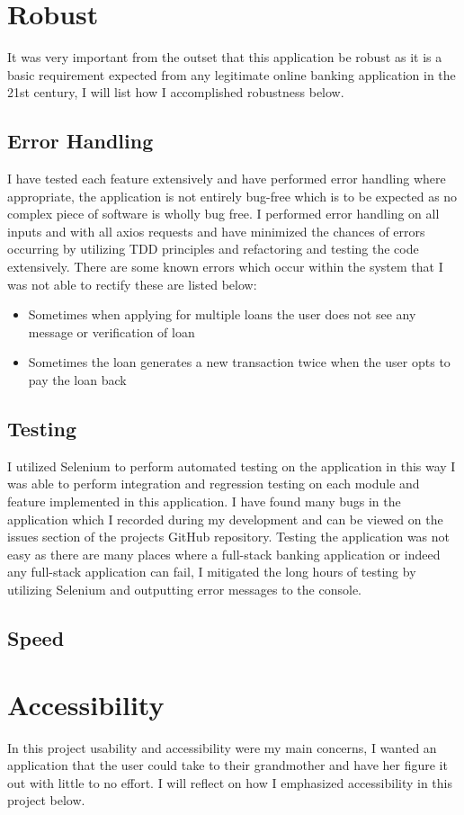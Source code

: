 \section{Robust}
It was very important from the outset that this application be robust as it is a basic requirement expected from any legitimate online banking application in the 21st century, I will list how I accomplished robustness below.
\subsection{Error Handling}
I have tested each feature extensively and have performed error handling where appropriate,
the application is not entirely bug-free which is to be expected as no complex piece of software
is wholly bug free.  I performed error handling on all inputs and with all axios requests and have
minimized the chances of errors occurring by utilizing TDD principles and refactoring and testing
the code extensively.  There are some known errors which occur within the system that I was not able to
rectify these are listed below:
\begin{itemize}
  \item Sometimes when applying for multiple loans the user does not see any message or verification of loan
  \item Sometimes the loan generates a new transaction twice when the user opts to pay the loan back
\end{itemize}
\subsection{Testing}
I utilized Selenium to perform automated testing on the application in this way I was able to perform
integration and regression testing on each module and feature implemented in this application.  I have
found many bugs in the application which I recorded during my development and can be viewed on the issues section
of the projects GitHub repository.  Testing the application was not easy as there are many places where a full-stack
banking application or indeed any full-stack application can fail, I mitigated the long hours of testing by utilizing
Selenium and outputting error messages to the console.
\subsection{Speed}
\section{Accessibility}
In this project usability and accessibility were my main concerns, I wanted an application that the user could take to their grandmother and have her figure it out with little to no effort.  I will reflect on how I emphasized accessibility in this project below.
